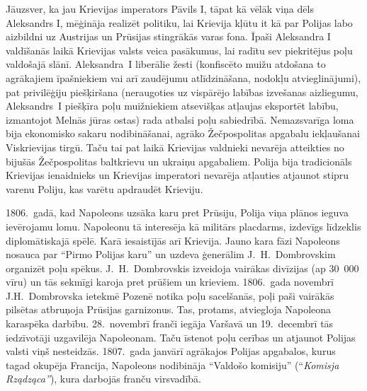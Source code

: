 \documentclass[twoside,a5paper,12pt,fleqn,openany]{extbook}
\newcommand{\asterism}{\vspace{1em}{\centering\Large\bfseries$\ast~\ast~\ast$\par}\vspace{1em}}
\newcommand{\pltxti}[1]{\textit{\textpolish{#1}}}
\begin{document}
Jāuzsver, ka jau Krievijas imperators Pāvils I, tāpat kā vēlāk viņa dēls Aleksandrs I, mēģināja realizēt politiku, lai Krievija kļūtu it kā par Polijas labo aizbildni uz Austrijas un Prūsijas stingrākās varas fona. Īpaši Aleksandra I valdīšanās laikā Krievijas valsts veica pasākumus, lai radītu sev piekritējus poļu valdošajā slānī. Aleksandra~I liberālie žesti (konfiscēto muižu atdošana to agrākajiem īpašniekiem vai arī zaudējumu atlīdzināšana, nodokļu atvieglinājumi), pat privilēģiju piešķiršana (neraugoties uz vispārējo labības izvešanas aizliegumu, Aleksandrs~I piešķīra poļu muižniekiem atsevišķas atļaujas eksportēt labību, izmantojot Melnās jūras ostas) rada atbalsi poļu sabiedrībā. Nemazsvarīga loma bija ekonomisko sakaru nodibināšanai, agrāko Žečpospolitas apgabalu iekļaušanai Viskrievijas tirgū. Taču tai pat laikā Krievijas valdnieki nevarēja atteikties no bijušās Žečpospolitas baltkrievu un ukraiņu apgabaliem. Polija bija tradicionāls Krievijas ienaidnieks un Krievijas imperatori nevarēja atļauties atjaunot stipru varenu Poliju, kas varētu apdraudēt Krieviju.

\asterism

1806.~gadā, kad Napoleons uzsāka karu pret Prūsiju, Polija viņa plānos ieguva ievērojamu lomu. Napoleonu tā interesēja kā militārs placdarms, izdevīgs līdzeklis diplomātiskajā spēlē. Karā iesaistījās arī Krievija. Jauno kara fāzi Napoleons nosauca par ``Pirmo Polijas karu'' un uzdeva ģenerālim J.~H.~Dombrovskim organizēt poļu spēkus. J.~H.~Dombrovskis izveidoja vairākas divīzijas (ap 30~000 vīru) un tās sekmīgi karoja pret prūšiem un krieviem. 1806.~gada novembrī J.H.~Dombrovska ietekmē Pozenē notika poļu sacelšanās, poļi paši vairākās pilsētas atbruņoja Prūsijas garnizonus. Tas, protams, atviegloja Napoleona karaspēka darbību. 28.~novembrī franči iegāja Varšavā un 19.~decembrī tās iedzīvotāji uzgavilēja Napoleonam. Taču īstenot poļu cerības un atjaunot Polijas valsti viņš nesteidzās. 1807.~gada janvārī agrākajos Polijas apgabalos, kurus tagad okupēja Francija, Napoleons nodibināja ``Valdošo komisiju'' (``\pltxti{Komisja Rządząca''}), kura darbojās franču virsvadībā.
\end{document}
